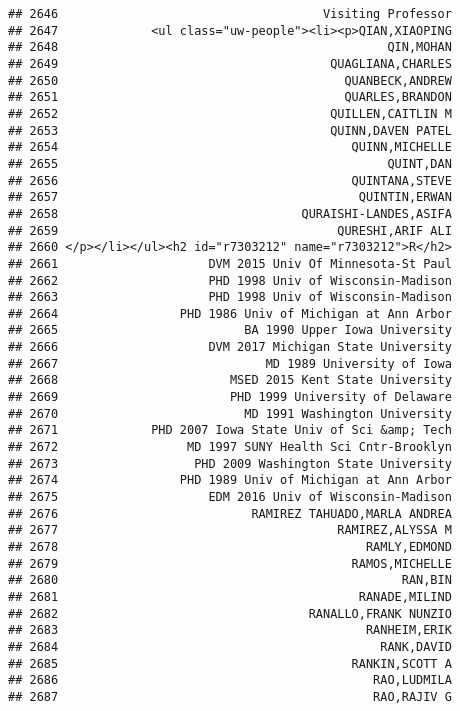 \documentclass[
]{article}
\begin{document}
\begin{verbatim}
## 2646                                     Visiting Professor
## 2647             <ul class="uw-people"><li><p>QIAN,XIAOPING
## 2648                                              QIN,MOHAN
## 2649                                      QUAGLIANA,CHARLES
## 2650                                        QUANBECK,ANDREW
## 2651                                        QUARLES,BRANDON
## 2652                                      QUILLEN,CAITLIN M
## 2653                                      QUINN,DAVEN PATEL
## 2654                                         QUINN,MICHELLE
## 2655                                              QUINT,DAN
## 2656                                         QUINTANA,STEVE
## 2657                                          QUINTIN,ERWAN
## 2658                                  QURAISHI-LANDES,ASIFA
## 2659                                       QURESHI,ARIF ALI
## 2660 </p></li></ul><h2 id="r7303212" name="r7303212">R</h2>
## 2661                     DVM 2015 Univ Of Minnesota-St Paul
## 2662                     PHD 1998 Univ of Wisconsin-Madison
## 2663                     PHD 1998 Univ of Wisconsin-Madison
## 2664                 PHD 1986 Univ of Michigan at Ann Arbor
## 2665                          BA 1990 Upper Iowa University
## 2666                     DVM 2017 Michigan State University
## 2667                             MD 1989 University of Iowa
## 2668                        MSED 2015 Kent State University
## 2669                        PHD 1999 University of Delaware
## 2670                          MD 1991 Washington University
## 2671             PHD 2007 Iowa State Univ of Sci &amp; Tech
## 2672                  MD 1997 SUNY Health Sci Cntr-Brooklyn
## 2673                   PHD 2009 Washington State University
## 2674                 PHD 1989 Univ of Michigan at Ann Arbor
## 2675                     EDM 2016 Univ of Wisconsin-Madison
## 2676                           RAMIREZ TAHUADO,MARLA ANDREA
## 2677                                       RAMIREZ,ALYSSA M
## 2678                                           RAMLY,EDMOND
## 2679                                         RAMOS,MICHELLE
## 2680                                                RAN,BIN
## 2681                                          RANADE,MILIND
## 2682                                   RANALLO,FRANK NUNZIO
## 2683                                           RANHEIM,ERIK
## 2684                                             RANK,DAVID
## 2685                                         RANKIN,SCOTT A
## 2686                                            RAO,LUDMILA
## 2687                                            RAO,RAJIV G

\end{verbatim}
\end{document}
